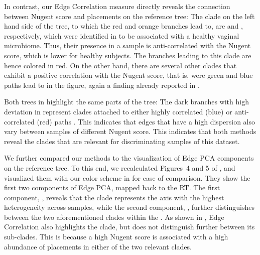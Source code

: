 In contrast, our Edge Correlation measure directly reveals
the connection between Nugent score and placements on the reference tree:
The clade on the left hand side of the tree, to which the red and orange branches lead to,
are  and , respectively,
which were identified in  to be associated with a healthy vaginal microbiome.
Thus, their presence in a sample is anti-correlated with the Nugent score, which is lower for healthy subjects.
The branches leading to this clade are hence colored in red.
On the other hand, there are several other clades that exhibit a positive correlation with the Nugent score,
that is, were green and blue paths lead to in the figure,
again a finding already reported in .

Both trees in  highlight the same parts of the tree:
The dark branches with high deviation in  represent clades
attached to either highly correlated (blue) or anti-correlated (red) paths .
This indicates that edges that have a high dispersion
also vary between samples of different Nugent score.
This indicates that both methods reveal the clades that are relevant for discriminating samples of this dataset.

We further compared our methods to the visualization of Edge PCA components on the reference tree.
To this end, we recalculated Figures~4 and 5 of ,
and visualized them with our color scheme in  for ease of comparison.
They show the first two components of Edge PCA, mapped back to the \ac{RT}.
The first component, ,
reveals that the  clade represents the axis with the highest heterogeneity across samples,
while the second component, ,
further distinguishes between the two aforementioned clades within the .
As shown in , Edge Correlation also highlights the  clade,
but does not distinguish further between its sub-clades.
This is because a high Nugent score is associated
with a high abundance of placements in either of the two relevant  clades.



